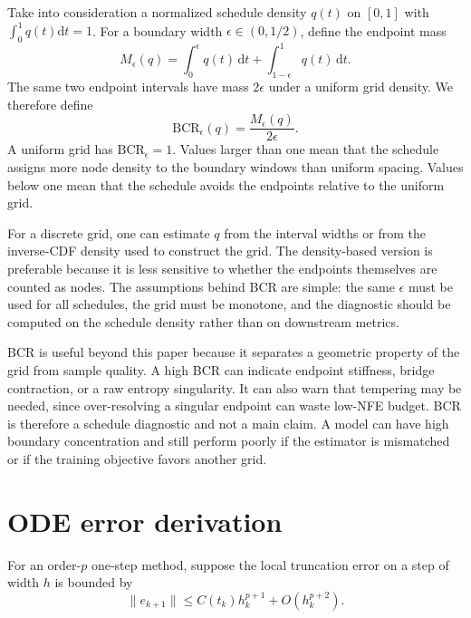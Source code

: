 \documentclass{article}
\newcommand{\dd}{\mathrm{d}}
\newcommand{\bcr}{\mathrm{BCR}}
\theoremstyle{plain}
\theoremstyle{definition}
\theoremstyle{remark}
\begin{document}
Take into consideration a normalized schedule density $q(t)$ on $[0,1]$ with $\int_0^1q(t)\dd t=1$. For a boundary width $\epsilon\in(0,1/2)$, define the endpoint mass
\begin{equation}
  M_\epsilon(q)
  =
  \int_0^\epsilon q(t)\,\dd t+\int_{1-\epsilon}^1 q(t)\,\dd t.
\end{equation}
The same two endpoint intervals have mass $2\epsilon$ under a uniform grid density. We therefore define
\begin{equation}
  \bcr_\epsilon(q)
  =
  \frac{M_\epsilon(q)}{2\epsilon}.
  \label{eq:bcr}
\end{equation}
A uniform grid has $\bcr_\epsilon=1$. Values larger than one mean that the schedule assigns more node density to the boundary windows than uniform spacing. Values below one mean that the schedule avoids the endpoints relative to the uniform grid.

For a discrete grid, one can estimate $q$ from the interval widths or from the inverse-CDF density used to construct the grid. The density-based version is preferable because it is less sensitive to whether the endpoints themselves are counted as nodes. The assumptions behind BCR are simple: the same $\epsilon$ must be used for all schedules, the grid must be monotone, and the diagnostic should be computed on the schedule density rather than on downstream metrics.

BCR is useful beyond this paper because it separates a geometric property of the grid from sample quality. A high BCR can indicate endpoint stiffness, bridge contraction, or a raw entropy singularity. It can also warn that tempering may be needed, since over-resolving a singular endpoint can waste low-NFE budget. BCR is therefore a schedule diagnostic and not a main claim. A model can have high boundary concentration and still perform poorly if the estimator is mismatched or if the training objective favors another grid.

\section{ODE error derivation}
\label{app:ode_error}

For an order-$p$ one-step method, suppose the local truncation error on a step of width $h$ is bounded by
\begin{equation}
  \|e_{k+1}\|\le C(t_k)h_k^{p+1}+O(h_k^{p+2}).
\end{equation}
\end{document}
